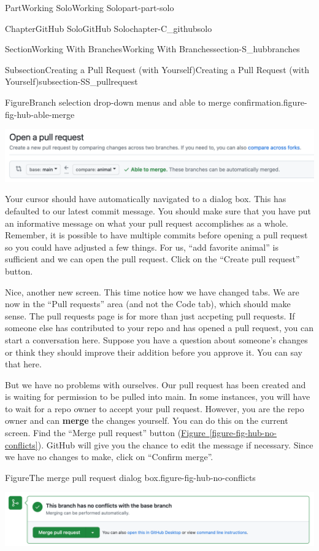 \documentclass[oneside,10pt,]{book}
\newcommand{\xreffont}{\relax}
\newcommand{\terminology}[1]{\textbf{#1}}
\begin{document}
\begin{partptx}{Part}{Working Solo}{}{Working Solo}{}{}{part-part-solo}
\begin{chapterptx}{Chapter}{GitHub Solo}{}{GitHub Solo}{}{}{chapter-C_githubsolo}
\begin{sectionptx}{Section}{Working With Branches}{}{Working With Branches}{}{}{section-S_hubbranches}
\begin{subsectionptx}{Subsection}{Creating a Pull Request (with Yourself)}{}{Creating a Pull Request (with Yourself)}{}{}{subsection-SS_pullrequest}
\begin{figureptx}{Figure}{Branch selection drop-down menus and able to merge confirmation.}{figure-fig-hub-able-merge}{}
\begin{image}{0.1}{0.8}{0.1}{}%
\includegraphics[width=\linewidth]{external/hub_able_merge.pdf}
\end{image}%
\tcblower
\end{figureptx}%
Your cursor should have automatically navigated to a dialog box. This has defaulted to our latest commit message. You should make sure that you have put an informative message on what your pull request accomplishes as a whole. Remember, it is possible to have multiple commits before opening a pull request so you could have adjusted a few things. For us, ``add favorite animal'' is sufficient and we can open the pull request. Click on the ``Create pull request'' button.%
\par
Nice, another new screen. This time notice how we have changed tabs. We are now in the ``Pull requests'' area (and not the Code tab), which should make sense. The pull requests page is for more than just accpeting pull requests. If someone else has contributed to your repo and has opened a pull request, you can start a conversation here. Suppose you have a question about someone's changes or think they should improve their addition before you approve it. You can say that here.%
\par
But we have no problems with ourselves. Our pull request has been created and is waiting for permission to be pulled into main. In some instances, you will have to wait for a repo owner to accept your pull request. However, you are the repo owner and can \terminology{merge} the changes yourself. You can do this on the current screen. Find the ``Merge pull request'' button (\hyperref[figure-fig-hub-no-conflicts]{Figure~{\xreffont\ref{figure-fig-hub-no-conflicts}}}). GitHub will give you the chance to edit the message if necessary. Since we have no changes to make, click on ``Confirm merge''.%
\begin{figureptx}{Figure}{The merge pull request dialog box.}{figure-fig-hub-no-conflicts}{}%
\begin{image}{0.05}{0.9}{0.05}{}%
\includegraphics[width=\linewidth]{external/hub_no_conflicts.pdf}

\end{image}
\end{figureptx}
\end{subsectionptx}
\end{sectionptx}
\end{chapterptx}
\end{partptx}
\end{document}
